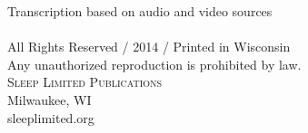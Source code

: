 \begin{titlepage}
    \begin{center}
        \date{}
        \null
        \vfill
        Transcription based on audio and video sources\\
        \HRule \\
        All Rights Reserved / 2014 / Printed in Wisconsin\\
        Any unauthorized reproduction is prohibited by law.\\
        \textsc{Sleep Limited Publications}\\
        Milwaukee, WI\\
        sleeplimited.org\\
    \end{center}

\end{titlepage}
